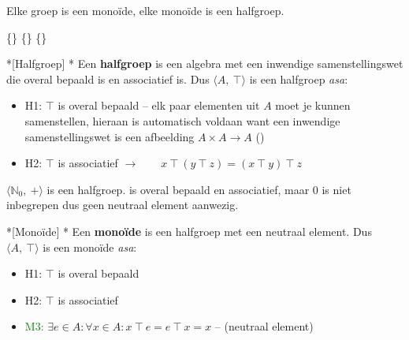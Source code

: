 Elke groep is een monoïde, elke monoïde is een halfgroep.

\begin{equationbox}[NavyBlue]
    \{\} \subseteq \{\} \subseteq \{\}
\end{equationbox}


\begin{nicedefinition}*[Halfgroep]
    \nextpart[]*
    Een \textcolor{PineGreen!75!black}{\textbf{halfgroep}} is een algebra met een inwendige samenstellingswet die overal bepaald is en associatief is. Dus $\langle A,\ \top \rangle$ is een halfgroep \emph{asa}:
    \begin{itemize}
        \item H1: $\top$ is overal bepaald -- elk paar elementen uit $A$ moet je kunnen samenstellen, hieraan is automatisch voldaan want een inwendige samenstellingswet is een afbeelding $A \times A \to A$ ()
        \item H2: $\top$ is associatief $\to \qquad x\ \top\ (y\ \top\ z) = (x\ \top\ y)\ \top\ z$
    \end{itemize}
\end{nicedefinition}

\textbf{} $\langle \mathbb{N}_0,\ + \rangle$ is een halfgroep. \inlinetext{$+$} is overal bepaald en associatief, maar $0$ is niet inbegrepen dus geen neutraal element aanwezig.


\begin{nicedefinition}*[Monoïde]
    \nextpart[]*
    Een \textcolor{PineGreen!75!black}{\textbf{monoïde}} is een halfgroep met een neutraal element. Dus $\langle A,\ \top \rangle$ is een monoïde \emph{asa}:
    \begin{itemize}
        \item H1: $\top$ is overal bepaald
        \item H2: $\top$ is associatief
        \item \textcolor{Green}{M3:} $\exists e \in A : \forall x \in A : x\ \top\ e = e\ \top\ x = x$ -- (neutraal element)
    \end{itemize}
\end{nicedefinition}

